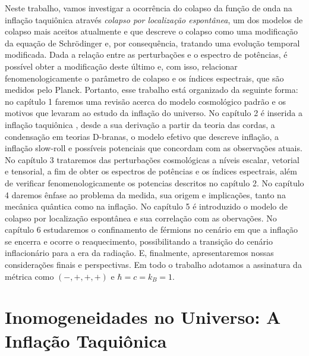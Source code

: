 \documentclass[
	12pt,				%
	openright,			%
	oneside,			%
	a4paper,			%
	english,			%
	french,				%
	spanish,			%
	brazil				%
	]{abntex2}
\begin{document}
Neste trabalho, vamos investigar a ocorrência do colapso da função de onda na inflação taquiônica através \emph{colapso por localização espontânea}, um dos modelos de colapso mais aceitos atualmente e que descreve o colapso como uma modificação da equação de Schr\"{o}dinger e, por consequência, tratando uma evolução temporal modificada. Dada a relação entre as perturbações e o espectro de potências, é possível obter a modificação deste último e, com isso, relacionar fenomenologicamente o parâmetro de colapso e os índices espectrais, que são medidos pelo Planck. Portanto, esse trabalho está organizado da seguinte forma: no capítulo 1 faremos uma revisão acerca do modelo cosmológico padrão e os motivos que levaram ao estudo da inflação do universo. No capítulo 2 é inserida a inflação taquiônica , desde a sua derivação a partir da teoria das cordas, a condensação em teorias D-branas, o modelo efetivo que descreve inflação, a inflação slow-roll e possíveis potenciais que concordam com as observações atuais. No capítulo 3 trataremos das perturbações cosmológicas a níveis escalar, vetorial e tensorial, a fim de obter os espectros de potências e os índices espectrais, além de verificar fenomenologicamente os potencias descritos no capítulo 2. No capítulo 4 daremos ênfase ao problema da medida, sua origem e implicações, tanto na mecânica quântica como na inflação. No capítulo 5 é introduzido o modelo de colapso por localização espontânea e sua correlação com as obervações. No capítulo 6 estudaremos o confinamento de férmions no cenário em que a inflação se encerra e ocorre o reaquecimento, possibilitando a transição do cenário inflacionário para a era da radiação. E, finalmente, apresentaremos nossas considerações finais e perspectivas. Em todo o trabalho adotamos a assinatura da métrica como $(-,+,+,+)$ e $\hbar = c = k_{B} = 1$.


\part{Inomogeneidades no Universo: A Inflação Taquiônica}

%



\end{document}
